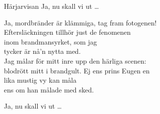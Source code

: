 \begin{song}{Härjarvisan}
	Ja, nu skall vi ut \ldots{}
	
    \showversenumber
	Ja, mordbränder är klämmiga, tag fram fotogenen!\\
	Eftersläckningen tillhör just de fenomenen\\
	inom brandmansyrket, som jag\\
	tycker är nå'n nytta med.\\
	Jag målar för mitt inre upp den härliga scenen:\\
	blodrött mitt i brandgult. Ej ens prins Eugen en\\
	lika mustig vy kan måla\\
	ens om han målade med sked.
	
	Ja, nu skall vi ut \ldots{}
	
\end{song}
